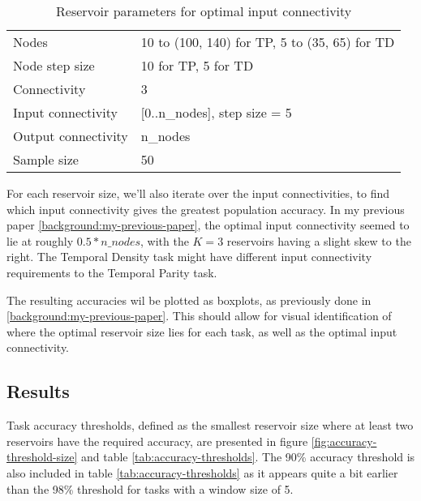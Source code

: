 \begin{table}[ht]
    \centering
    \caption{Reservoir parameters for optimal input connectivity}
    \label{tab:ic-reservoir-parameters}
    \begin{tabular}{ll}
        Nodes               & 10 to (100, 140) for TP, 5 to (35, 65) for TD \\
        Node step size      & 10 for TP, 5 for TD \\
        Connectivity        & 3                              \\
        Input connectivity  & [0..n\_nodes], step size = 5   \\
		Output connectivity & n\_nodes                       \\
        Sample size         & 50
    \end{tabular}
\end{table}

For each reservoir size, we'll also iterate over the input connectivities,
to find which input connectivity gives the greatest population accuracy.
In my previous paper \ref{background:my-previous-paper},
the optimal input connectivity seemed to lie at roughly $ 0.5*n\_nodes $,
with the $K=3$ reservoirs having a slight skew to the right.
The Temporal Density task might have different input connectivity requirements to the Temporal Parity task.

The resulting accuracies wil be plotted as boxplots, as previously done in \ref{background:my-previous-paper}.
This should allow for visual identification of where the optimal reservoir size lies for each task,
as well as the optimal input connectivity.

\subsection{Results}

Task accuracy thresholds,
defined as the smallest reservoir size where at least two reservoirs have the required accuracy,
are presented in figure \ref{fig:accuracy-threshold-size} and table \ref{tab:accuracy-thresholds}.
The 90\% accuracy threshold is also included in table \ref{tab:accuracy-thresholds} as it appears quite a bit earlier than the 98\% threshold for tasks with a window size of 5.


